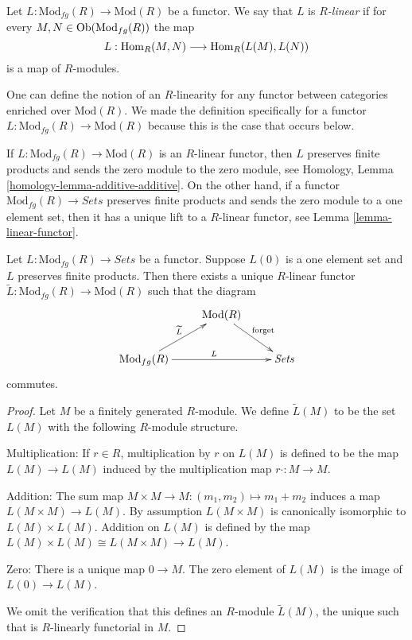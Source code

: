 \begin{definition}
\label{definition-linear}
Let $L: \text{Mod}_{fg}(R) \to \text{Mod}(R)$ be a
functor.  We say that $L$ is {\it $R$-linear} if for every $M, N \in
\mathop{\rm Ob}\nolimits(\text{Mod}_{fg}(R))$ the map
$$
L : \mathop{\rm Hom}\nolimits_R(M, N) \longrightarrow \mathop{\rm Hom}\nolimits_R(L(M), L(N))
$$
is a map of $R$-modules.
\end{definition}

\begin{remark}
\label{remark-linear-enriched-over-modules}
One can define the notion of an $R$-linearity for any functor between
categories enriched over $\text{Mod}(R)$. We made the definition
specifically for a functor $L: \text{Mod}_{fg}(R) \to
\text{Mod}(R)$ because this is the case that occurs below.
\end{remark}

\begin{remark}
\label{remark-linear-functor}
If $L: \text{Mod}_{fg}(R) \to \text{Mod}(R)$ is an $R$-linear functor,
then $L$ preserves finite products and sends the zero module to the zero
module, see
Homology, Lemma \ref{homology-lemma-additive-additive}.
On the other hand, if a functor $\text{Mod}_{fg}(R) \to \textit{Sets}$
preserves finite products and sends the zero module to a one element set,
then it has a unique lift to a $R$-linear functor, see
Lemma \ref{lemma-linear-functor}.
\end{remark}

\begin{lemma}
\label{lemma-linear-functor}
Let $L: \text{Mod}_{fg}(R) \to \textit{Sets}$ be a
functor.  Suppose $L(0)$ is a one element set and $L$ preserves finite
products.  Then there exists a unique $R$-linear functor
$\widetilde{L} : \text{Mod}_{fg}(R) \to \text{Mod}(R)$ such that the
diagram
$$
\xymatrix{
& \text{Mod}(R) \ar[dr]^{\text{forget}} &   \\
\text{Mod}_{fg}(R)  \ar[ur]^{\widetilde{L}} \ar[rr]^{L} &  &
\textit{Sets}
}
$$
commutes.
\end{lemma}

\begin{proof}
Let $M$ be a finitely generated $R$-module. We define $\widetilde{L}(M)$ to be
the set $L(M)$ with the following $R$-module structure.

\medskip\noindent
Multiplication: If $r \in R$, multiplication by $r$ on $L(M)$ is defined to be
the map $L(M) \to L(M)$ induced by the multiplication map
$r \cdot: M \to M$.

\medskip\noindent
Addition: The sum map $M \times M \to M: (m_1, m_2) \mapsto m_1 + m_2$
induces a map $L(M \times M) \to L(M)$. By assumption $L(M \times M)$
is canonically isomorphic to $L(M) \times L(M)$.  Addition on $L(M)$ is defined
by the map $L(M) \times L(M) \cong L(M \times M) \to L(M)$.

\medskip\noindent
Zero: There is a unique map $0 \to M$. The zero element of $L(M)$ is
the image of $L(0) \to L(M)$.

\medskip\noindent
We omit the verification that this defines an $R$-module $\widetilde{L}(M)$,
the unique such that is $R$-linearly functorial in $M$.
\end{proof}

